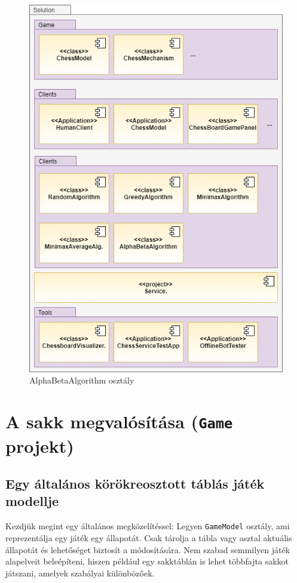 \documentclass[twoside, a4paper, 12pt]{book}
\begin{document}
\begin{figure}[htbp]
	\centering
	\includegraphics[width=1.0\textwidth]{img/solutionStructure.png}
	\caption{AlphaBetaAlgorithm osztály}
	\label{fig:solutionStructure}
\end{figure}

\section{A sakk megvalósítása (\texttt{Game} projekt)}
\subsection{Egy általános körökreosztott táblás játék modellje}
Kezdjük megint egy általános megközelítéssel: Legyen \texttt{GameModel} osztály, ami reprezentálja egy játék egy állapotát. Csak tárolja a tábla vagy asztal aktuális állapotát és lehetőséget biztosít a módosítására. Nem szabad semmilyen játék alapelveit beleépíteni, hiszen például egy sakktáblán is lehet többfajta sakkot játszani, amelyek szabályai különbözőek.
\end{document}
